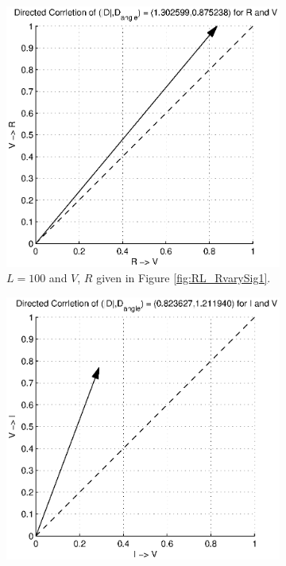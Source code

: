 \documentclass[a4paper,11pt]{article}
\begin{document}
\begin{figure}[h!t]
\centering
\begin{subfigure}[b]{0.25\textwidth}
\label{fig:RL_RvarySig1CCMVR}
\includegraphics[scale=0.4]{graphics/RL_RvarySig1CCMVR.eps}
\caption{$L = 100$ and $V$, $R$ given in Figure  \ref{fig:RL_RvarySig1}.}
\end{subfigure}
\begin{subfigure}[b]{0.25\textwidth}
\label{fig:RL_RvarySig1CCMVI}
\includegraphics[scale=0.4]{graphics/RL_RvarySig1CCMVI.eps}

\end{subfigure}
\end{figure}
\end{document}
